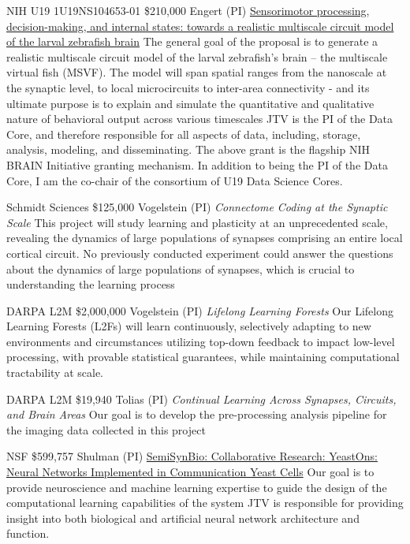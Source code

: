 \documentclass[10pt,colorlinks=true,urlcolor=blue]{moderncv}
\begin{document}
    {NIH U19 1U19NS104653-01}%
    {\$210,000}%
    {Engert (PI)}
    {\href{http://grantome.com/grant/NIH/U19-NS104653-02}%
    {Sensorimotor processing, decision-making, and internal states: towards a realistic multiscale circuit model of the larval zebrafish brain} 
    The general goal of the proposal is to generate a realistic multiscale circuit model of the larval zebrafish’s brain – the multiscale virtual fish (MSVF). The model will span spatial ranges from the nanoscale at the synaptic level, to local microcircuits to inter-area connectivity - and its ultimate purpose is to explain and simulate the quantitative and qualitative nature of behavioral output across various timescales}%
    {JTV is the PI of the Data Core, and therefore responsible for all aspects of data, including, storage, analysis, modeling, and disseminating.}
    {The above grant is the flagship NIH BRAIN Initiative granting mechanism.  In addition to being the PI of the Data Core, I am the co-chair of the consortium of U19 Data Science Cores.}


    {Schmidt Sciences}%
    {\$125,000}%
    {Vogelstein (PI)}
    {\emph{Connectome Coding at the Synaptic Scale} 
    This project will study learning and plasticity at an unprecedented scale, revealing the dynamics of large populations of synapses comprising an entire local cortical circuit. No previously conducted experiment could answer the questions about the dynamics of large populations of synapses, which is crucial to understanding the learning process}%
    {}
    {}

    {DARPA L2M}%
    {\$2,000,000}%
    {Vogelstein (PI)}
    {\emph{Lifelong Learning Forests}
    Our Lifelong Learning Forests (L2Fs) will learn continuously, selectively adapting to new environments and circumstances utilizing top-down feedback to impact low-level processing, with provable statistical guarantees, while maintaining computational tractability at scale.  }%
    {}
    {}

    {DARPA L2M}%
    {\$19,940}%
    {Tolias (PI)}    
    {\emph{Continual Learning Across Synapses, Circuits, and Brain Areas}
    Our  goal is to develop the pre-processing analysis pipeline for the imaging data collected in this project}%
    {}
    {}

    {NSF}%
    {\$599,757}%
    {Shulman (PI)}
    {\href{http://grantome.com/grant/NSF/MCB-1807546}%
    {SemiSynBio: Collaborative Research: YeastOns: Neural Networks Implemented in Communication Yeast Cells}
    Our goal is to provide neuroscience and machine learning expertise to guide the design of the computational learning capabilities of the system}%
    {JTV is responsible for providing insight into both biological and artificial neural network architecture and function.}
    {}
\end{document}
